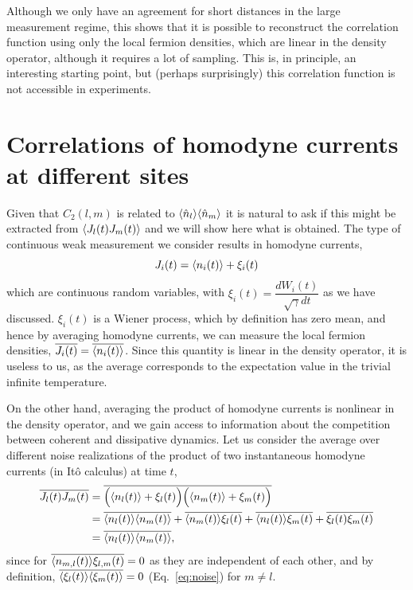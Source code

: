 Although we only have an agreement for short distances in the large measurement regime, this shows that it is possible to reconstruct the correlation function using only the local fermion densities, which are linear in the density operator, although it requires a lot of sampling. This is, in principle, an interesting starting point, but (perhaps surprisingly) this correlation function is not accessible in experiments.

\section{Correlations of homodyne currents at different sites}

Given that $C_2(l,m)$ is related to $\langle\hat{n}_l\rangle \langle\hat{n}_m\rangle$ it is natural to ask if this might be extracted from $\langle J_l(t) J_m(t)\rangle$ and we will show here what is obtained. The type of continuous weak measurement we consider results in homodyne currents, 
\begin{equation}
    J_i(t) = \langle n_i(t)\rangle + \xi_i(t) 
\end{equation}
which are continuous random variables, with $\xi_i(t) = \dfrac{dW_i(t)}{\sqrt{\gamma} dt}$ as we have discussed. $\xi_i(t)$ is a Wiener process, which by definition has zero mean, and hence by averaging homodyne currents, we can measure the local fermion densities, $\overline{J_i(t)} = \overline{\langle n_i(t)\rangle}$. Since this quantity is linear in the density operator, it is useless to us, as the average corresponds to the expectation value in the trivial infinite temperature. 

On the other hand, averaging the product of homodyne currents is nonlinear in the density operator, and we gain access to information about the competition between coherent and dissipative dynamics. Let us consider the average over different noise realizations of the product of two instantaneous homodyne currents (in It\^o calculus) at time $t$,
\begin{align}
\begin{split}
    \overline{J_l(t) J_m(t)} &= \overline{\Big(\langle n_l(t)\rangle +  \xi_l(t) \Big) \Big(\langle n_m(t)\rangle +  \xi_m(t)  \Big)} \\
     &= \overline{\langle n_l(t)\rangle\langle n_m(t)\rangle} + \overline{\langle n_m(t)\rangle  \xi_l(t)}  + \overline{\langle n_l(t)\rangle  \xi_m(t)}  + \overline{\xi_l(t) \xi_m(t)}\\
     &= \overline{\langle n_l(t)\rangle\langle n_m(t)\rangle},
\end{split}
\end{align}
since for $\overline{\langle n_{m,l}(t)\rangle  \xi_{l,m}(t)} = 0$ as they are independent of each other, and by definition, $\overline{\langle\xi_l(t)\rangle\langle\xi_m(t)\rangle} = 0$ (Eq.~\ref{eq:noise}) for $m \neq l$. 

